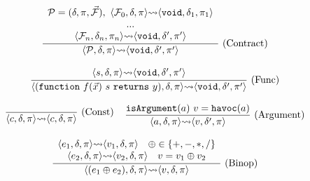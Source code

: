 \documentclass[conference, romanappendices]{tex/IEEEtran}
\theoremstyle{bfnote}
\newcommand{\contract}{\mathcal{P}}
\newcommand{\valEnv}{\delta}
\newcommand{\pathEnv}{\pi}
\newcommand{\func}{\mathcal{F}}
\newcommand{\stmt}{s}
\newcommand{\irulelabel}[3]
{
\mkern-2mu
\begin{array}{ll}
\displaystyle\frac{#1}{\vphantom{,}#2} & \!\!\!\!#3
\end{array}
\mkern-2mu
}
\begin{document}
	
	
	

	
		
		
		
		

	
	

	
	
	
	
	
	
	
\begin{figure}[t]
\vspace{-1mm}
\footnotesize
\[
\hspace{-20pt}
\begin{array}{c}

\irulelabel
{\begin{array}{c}
\contract= (\valEnv, \pathEnv, \vec{\func}), \ 
{\langle \func_0, \valEnv,\pathEnv \rangle {\leadsto} \langle \mathtt{void}, \valEnv_1, \pathEnv_1 \rangle}\\
...\\
{\langle \func_n, \valEnv_n,\pathEnv_n \rangle {\leadsto} \langle \mathtt{void}, \valEnv', \pathEnv' \rangle}
\end{array}}
{\langle \contract, \valEnv,\pathEnv \rangle {\leadsto} \langle \mathtt{void}, \valEnv', \pathEnv' \rangle}
{\textrm{(Contract)}} \\ \ \\

\irulelabel
{\begin{array}{c}
    {\langle \stmt, \valEnv,\pathEnv \rangle {\leadsto} \langle \mathtt{void}, \valEnv', \pathEnv' \rangle} \\
\end{array}}
{\langle (\mathtt{function} \ f(\vec{x}) \ s \ \mathtt{returns} \ y), \valEnv,\pathEnv \rangle {\leadsto} \langle \mathtt{void}, \valEnv', \pathEnv' \rangle}
{\textrm{(Func)}} \\ \ \\

\irulelabel
{}
{\langle c, \valEnv,\pathEnv \rangle {\leadsto} \langle c, \valEnv, \pathEnv \rangle}
{\textrm{(Const)}} 
~
\irulelabel
{\mathtt{isArgument}(a) \ v=\mathtt{havoc}(a)}
{\langle a, \valEnv,\pathEnv \rangle {\leadsto} \langle v, \valEnv', \pathEnv \rangle}
{\textrm{(Argument)}} \\ \ \\

\irulelabel
{\begin{array}{c}
    {\langle e_1, \valEnv,\pathEnv \rangle {\leadsto} \langle v_1, \valEnv, \pathEnv \rangle} \quad  \oplus \in \{+,-,*,/ \} \\ 
    {\langle e_2, \valEnv,\pathEnv \rangle {\leadsto} \langle v_2, \valEnv, \pathEnv \rangle} \quad v = v_1 \oplus v_2 \\
\end{array}}
{\langle (e_1 \oplus e_2), \valEnv,\pathEnv \rangle {\leadsto} \langle v, \valEnv, \pathEnv \rangle}
{\textrm{(Binop)}} \\ \ \\


\end{array}\]
\end{figure}
\end{document}
